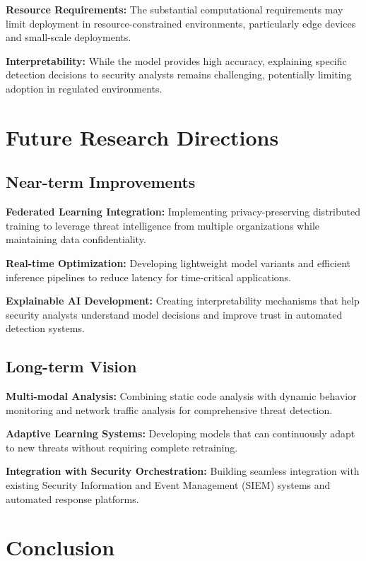 \documentclass[12pt,a4paper]{article}
\begin{document}
\textbf{Resource Requirements:} The substantial computational requirements may limit deployment in resource-constrained environments, particularly edge devices and small-scale deployments.

\textbf{Interpretability:} While the model provides high accuracy, explaining specific detection decisions to security analysts remains challenging, potentially limiting adoption in regulated environments.

\section{Future Research Directions}

\subsection{Near-term Improvements}

\textbf{Federated Learning Integration:} Implementing privacy-preserving distributed training to leverage threat intelligence from multiple organizations while maintaining data confidentiality.

\textbf{Real-time Optimization:} Developing lightweight model variants and efficient inference pipelines to reduce latency for time-critical applications.

\textbf{Explainable AI Development:} Creating interpretability mechanisms that help security analysts understand model decisions and improve trust in automated detection systems.

\subsection{Long-term Vision}

\textbf{Multi-modal Analysis:} Combining static code analysis with dynamic behavior monitoring and network traffic analysis for comprehensive threat detection.

\textbf{Adaptive Learning Systems:} Developing models that can continuously adapt to new threats without requiring complete retraining.

\textbf{Integration with Security Orchestration:} Building seamless integration with existing Security Information and Event Management (SIEM) systems and automated response platforms.

\section{Conclusion}
\end{document}
